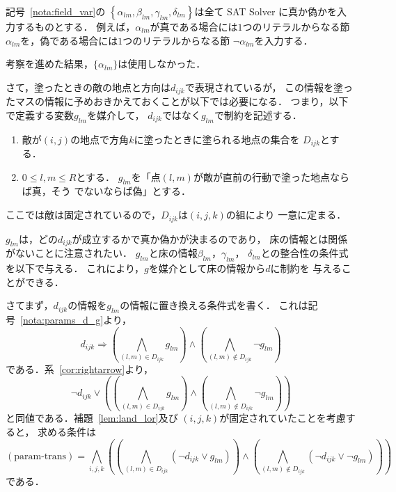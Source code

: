 \begin{rem} \label{rem:chikaku}
 記号~\ref{nota:field_var}の
 $\left\{ \alpha_{lm}, \beta_{lm}, \gamma_{lm}, \delta_{lm}
 \right\}$は全て
 SAT Solver に真か偽かを入力するものとする．
 例えば，$\alpha_{lm}$が真である場合には$1$つのリテラルからなる節
 $\alpha_{lm}$を，偽である場合には$1$つのリテラルからなる節
 $\lnot \alpha_{lm}$を入力する．
\end{rem}

\begin{rem}
 考察を進めた結果，$\{ \alpha_{lm} \}$は使用しなかった．
\end{rem}

さて，塗ったときの敵の地点と方向は$d_{ijk}$で表現されているが，
この情報を塗ったマスの情報に予めおきかえておくことが以下では必要になる．
つまり，以下で定義する変数$g_{lm}$を媒介して，
$d_{ijk}$ではなく$g_{lm}$で制約を記述する．

\begin{nota}[塗った地点の情報を媒介する変数] \label{nota:params_d_g}
 \begin{enumerate}[1.]
  \item 敵が$(i, j)$の地点で方角$k$に塗ったときに塗られる地点の集合を
        $D_{ijk}$とする．
  \item $0 \leq l, m \leq R$とする．
        $g_{lm}$を「点$(l, m)$が敵が直前の行動で塗った地点ならば真，そう
        でないならば偽」とする．
 \end{enumerate}
\end{nota}

\begin{rem}
 ここでは敵は固定されているので，$D_{ijk}$は$(i, j, k)$の組により
 一意に定まる．
\end{rem}

\begin{rem} 
 $g_{lm}$は，どの$d_{ijk}$が成立するかで真か偽かが決まるのであり，
 床の情報とは関係がないことに注意されたい．
 $g_{lm}$と床の情報$\beta_{lm}$，$\gamma_{lm}$，
 $\delta_{lm}$との整合性の条件式を以下で与える．
 これにより，$g$を媒介として床の情報から$d$に制約を
 与えることができる．
\end{rem}

さてまず，$d_{ijk}$の情報を$g_{lm}$の情報に置き換える条件式を書く．
これは記号~\ref{nota:params_d_g}より，
\[
 d_{ijk} \Rightarrow \left( \bigwedge_{(l, m) \in D_{ijk}} g_{lm} \right)
 \land \left( \bigwedge_{(l, m) \not\in D_{ijk}} \lnot g_{lm} \right)
\]
である．系~\ref{cor:rightarrow}より，
\[
 \lnot d_{ijk} \lor 
 \left(
 \left( \bigwedge_{(l, m) \in D_{ijk}} g_{lm} \right)
 \land \left( \bigwedge_{(l, m) \not\in D_{ijk}} \lnot g_{lm} \right)
 \right)
\]
と同値である．補題~\ref{lem:land_lor}及び
$(i, j, k)$が固定されていたことを考慮すると，
求める条件は
\begin{equation}
 (\text{param-trans}) = \bigwedge_{i, j, k} \left(
                            \left( \bigwedge_{(l, m) \in D_{ijk}}
                             (\lnot d_{ijk} \lor g_{lm}) \right)
                            \land
                            \left( \bigwedge_{(l, m) \not\in D_{ijk}}
                             (\lnot d_{ijk} \lor \lnot g_{lm}) \right)
                           \right)
\end{equation}
である．

